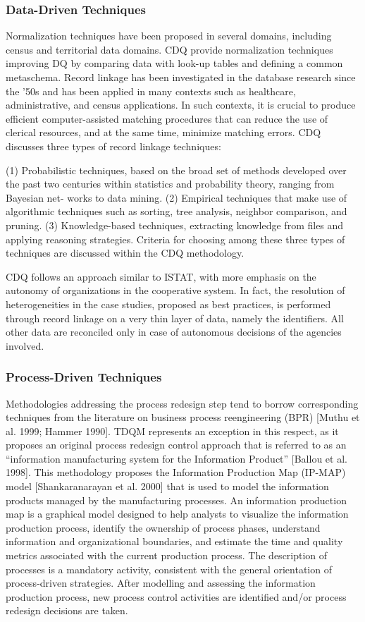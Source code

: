 \documentclass[pdftex,english,oribibl]{llncs}
\begin{document}
\subsubsection{Data-Driven Techniques}
Normalization techniques have been proposed in several domains, including census and territorial data domains.
CDQ provide normalization techniques improving DQ by comparing data with look-up tables and defining a common metaschema.
Record linkage has been investigated in the database research since the ’50s and has been applied in many contexts such as healthcare, administrative, and census applications.
In such contexts, it is crucial to produce efficient computer-assisted matching procedures that can reduce the use of clerical resources, and at the same time, minimize matching errors.
CDQ discusses three types of record linkage techniques:

(1) Probabilistic techniques, based on the broad set of methods developed over the past two centuries within statistics and probability theory, ranging from Bayesian net- works to data mining.
(2) Empirical techniques that make use of algorithmic techniques such as sorting, tree analysis, neighbor comparison, and pruning.
(3) Knowledge-based techniques, extracting knowledge from files and applying reasoning strategies.
Criteria for choosing among these three types of techniques are discussed within the CDQ methodology.

CDQ follows an approach similar to ISTAT, with more emphasis on the autonomy of organizations in the cooperative system.
In fact, the resolution of heterogeneities in the case studies, proposed as best practices, is performed through record linkage on a very thin layer of data, namely the identifiers.
All other data are reconciled only in case of autonomous decisions of the agencies involved.
\subsubsection{Process-Driven Techniques}
Methodologies addressing the process redesign step tend to borrow corresponding techniques from the literature on business process reengineering (BPR) [Muthu et al. 1999; Hammer 1990].
TDQM represents an exception in this respect, as it proposes an original process redesign control approach that is referred to as an “information manufacturing system for the Information Product” [Ballou et al. 1998].
This methodology proposes the Information Production Map (IP-MAP) model [Shankaranarayan et al. 2000] that is used to model the information products managed by the manufacturing processes.
An information production map is a graphical model designed to help analysts to visualize the information production process, identify the ownership of process phases, understand information and organizational boundaries, and estimate the time and quality metrics associated with the current production process.
The description of processes is a mandatory activity, consistent with the general orientation of process-driven strategies.
After modelling and assessing the information production process, new process control activities are identified and/or process redesign decisions are taken.
\end{document}
